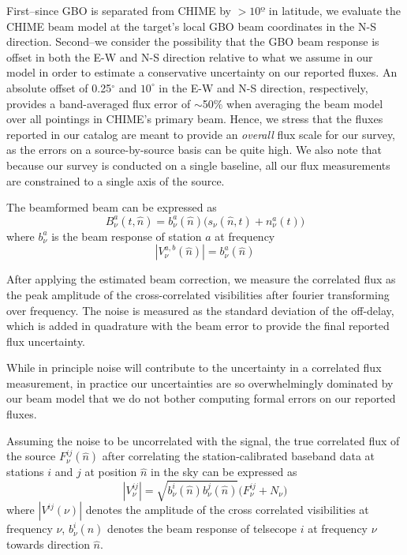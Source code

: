 \documentclass[twocolumn]{aastex631}
\begin{document}
First–since GBO is separated from CHIME by $>10º$ in latitude, we evaluate the CHIME beam model at the target's local GBO beam coordinates in the N-S direction. Second–we consider the possibility that the GBO beam response is offset in both the E-W and N-S direction relative to what we assume in our model in order to estimate a conservative uncertainty on our reported fluxes. An absolute offset of 0.25$^\circ$ and $10^\circ$ in the E-W and N-S direction, respectively, provides a band-averaged flux error of $\sim$50$\%$ when averaging the beam model over all pointings in CHIME's primary beam. Hence, we stress that the fluxes reported in our catalog are meant to provide an \emph{overall} flux scale for our survey, as the errors on a source-by-source basis can be quite high. We also note that because our survey is conducted on a single baseline, all our flux measurements are constrained to a single axis of the source. 

The beamformed beam can be expressed as 
\begin{equation}
    B^{a}_\nu(t,\hat{n}) = b^{a}_\nu (\hat{n})\big(s_\nu(\hat{n},t)+n^{a}_\nu(t) \big)
\end{equation}
where $b^{a}_\nu$ is the beam response of station $a$ at frequency %
\begin{equation}
    |V_{\nu}^{a,b}(\hat{n})| = b^{a}_\nu (\hat{n})
\end{equation}

After applying the estimated beam correction, we measure the correlated flux as the peak amplitude of the cross-correlated visibilities after fourier transforming over frequency. The noise is measured as the standard deviation of the off-delay, which is added in quadrature with the beam error to provide the final reported flux uncertainty. 

While in principle noise will contribute to the uncertainty in a correlated flux measurement, in practice our uncertainties are so overwhelmingly dominated by our beam model that we do not bother computing formal errors on our reported fluxes. 



Assuming the noise to be uncorrelated with the signal, the true correlated flux of the source $F^{ij}_\nu(\hat{n})$ after correlating the station-calibrated baseband data at stations $i$ and $j$ at position $\hat{n}$ in the sky can be expressed as 
\begin{equation}
    |V^{ij}_\nu|=\sqrt{b^i_\nu(\hat{n})b^j_\nu(\hat{n})} \big(F^{ij}_{\nu}+N_{\nu}\big)
\end{equation}
where $|V^{ij}(\nu)|$ denotes the amplitude of the cross correlated visibilities at frequency $\nu$,  $b^i_\nu(\hat{n})$ denotes the beam response of telsecope $i$ at frequency $\nu$ towards direction $\hat{n}$. 
\end{document}
